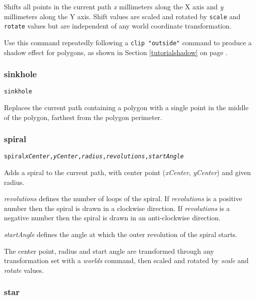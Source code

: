 Shifts all points in the current path \textit{x} millimeters along the X axis
and \textit{y} millimeters along the Y axis.  Shift values are scaled and
rotated by \texttt{scale} and \texttt{rotate} values but are independent
of any world coordinate transformation.

Use this command
repeatedly following a \texttt{clip "outside"} command to produce a shadow
effect for polygons, as shown in 
Section \ref{tutorialshadow} on page \pageref{tutorialshadow}.

\subsubsection{sinkhole}

\begin{alltt}
sinkhole
\end{alltt}

Replaces the current path containing a polygon with a single point in the
middle of the polygon, farthest from the polygon perimeter.

\subsubsection{spiral}

\begin{alltt}
spiral \textit{xCenter}, \textit{yCenter}, \textit{radius}, \textit{revolutions}, \textit{startAngle}
\end{alltt}

Adds a spiral to the current path, with center
point (\textit{xCenter}, \textit{yCenter}) and given radius.

\textit{revolutions} defines the number of loops of the spiral.
If \textit{revolutions}
is a positive number then the spiral is drawn in a clockwise direction.
If \textit{revolutions} is a negative number then the spiral
is drawn in an anti-clockwise direction.

\textit{startAngle} defines the
angle at which the outer revolution of the spiral starts.

The center point, radius and start angle are transformed through any
transformation set with a \textit{worlds} command,
then scaled and rotated by \textit{scale}
and \textit{rotate} values.

\subsubsection{star}

